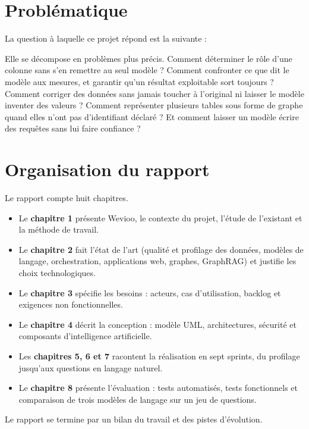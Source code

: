 \section*{Problématique}

La question à laquelle ce projet répond est la suivante :


Elle se décompose en problèmes plus précis. Comment déterminer le rôle d'une colonne sans s'en remettre au seul modèle ? Comment confronter ce que dit le modèle aux mesures, et garantir qu'un résultat exploitable sort toujours ? Comment corriger des données sans jamais toucher à l'original ni laisser le modèle inventer des valeurs ? Comment représenter plusieurs tables sous forme de graphe quand elles n'ont pas d'identifiant déclaré ? Et comment laisser un modèle écrire des requêtes sans lui faire confiance ?

\section*{Organisation du rapport}

Le rapport compte huit chapitres.

\begin{itemize}
  \item Le \textbf{chapitre 1} présente Wevioo, le contexte du projet, l'étude de l'existant et la méthode de travail.
  \item Le \textbf{chapitre 2} fait l'état de l'art (qualité et profilage des données, modèles de langage, orchestration, applications web, graphes, GraphRAG) et justifie les choix technologiques.
  \item Le \textbf{chapitre 3} spécifie les besoins : acteurs, cas d'utilisation, backlog et exigences non fonctionnelles.
  \item Le \textbf{chapitre 4} décrit la conception : modèle UML, architectures, sécurité et composants d'intelligence artificielle.
  \item Les \textbf{chapitres 5, 6 et 7} racontent la réalisation en sept sprints, du profilage jusqu'aux questions en langage naturel.
  \item Le \textbf{chapitre 8} présente l'évaluation : tests automatisés, tests fonctionnels et comparaison de trois modèles de langage sur un jeu de questions.
\end{itemize}

Le rapport se termine par un bilan du travail et des pistes d'évolution.
